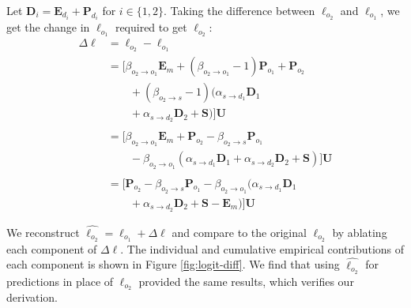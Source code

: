 Let
\(\boldsymbol D_i =\boldsymbol E_{d_i} +\boldsymbol P_{d_i}\) for $i \in \{1,2\}$.
Taking the difference between $\boldsymbol\ell_{o_2}$ and $\boldsymbol\ell_{o_1}$, we get the change in $\boldsymbol\ell_{o_1}$ required to get $\boldsymbol\ell_{o_2}$:
\begin{equation}
\label{eq:o1o2_logit_diff}
\begin{split}
    \Delta\boldsymbol\ell &= \boldsymbol\ell_{o_2} -\boldsymbol\ell_{o_1}
    \\ 
    &= [\beta_{o_2 \to o_1}\boldsymbol E_m + (\beta_{o_2 \to o_1}-1)\boldsymbol P_{o_1} +\boldsymbol P_{o_2} 
    \\ &\qquad 
    + (\beta_{o_2 \to s}-1)(\alpha_{s \to d_1}\boldsymbol D_1 
    \\ &\qquad
    + \alpha_{s \to d_2}\boldsymbol D_2 +\boldsymbol S)]\boldsymbol U 
    \\ \\
    &= [\beta_{o_2 \to o_1}\boldsymbol E_m +\boldsymbol P_{o_2}
    -\beta_{o_2 \to s}\boldsymbol P_{o_1} 
    \\ &\qquad
    -\beta_{o_2 \to o_1}(\alpha_{s \to d_1}\boldsymbol D_1 
    + \alpha_{s \to d_2}\boldsymbol D_2 +\boldsymbol S)]\boldsymbol U 
    \\ \\
    &= [\boldsymbol P_{o_2} - \beta_{o_2 \to s}\boldsymbol P_{o_1} 
    -\beta_{o_2 \to o_1}(\alpha_{s \to d_1}\boldsymbol D_1 
    \\ &\qquad
    + \alpha_{s \to d_2}\boldsymbol D_2 +\boldsymbol S -\boldsymbol E_m)]\boldsymbol U
\end{split}
\end{equation}


We reconstruct $\hat{\boldsymbol\ell_{o_2}} = \boldsymbol\ell_{o_1} + \Delta\boldsymbol\ell$ and compare to the original $\boldsymbol\ell_{o_2}$ by ablating each component of $\Delta\boldsymbol\ell$. The individual and cumulative empirical contributions of each component is shown in Figure \ref{fig:logit-diff}.
We find that using $\hat{\boldsymbol\ell_{o_2}}$ for predictions in place of $\boldsymbol\ell_{o_2}$ provided the same results, which verifies our derivation.

